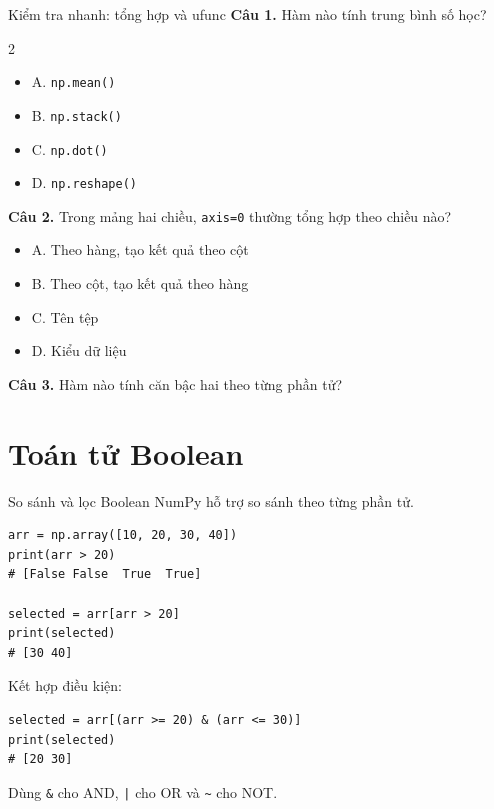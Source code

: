 \documentclass[aspectratio=169,11pt]{beamer}
\newcommand{\quiztitle}[1]{\textbf{\textcolor{QuizOrange}{#1}}}
\begin{document}
\begin{frame}{Kiểm tra nhanh: tổng hợp và ufunc}
\small
\quiztitle{Câu 1.} Hàm nào tính trung bình số học?
\begin{multicols}{2}
\begin{itemize}
  \item A. \texttt{np.mean()}
  \item B. \texttt{np.stack()}
  \item C. \texttt{np.dot()}
  \item D. \texttt{np.reshape()}
\end{itemize}
\end{multicols}
\quiztitle{Câu 2.} Trong mảng hai chiều, \texttt{axis=0} thường tổng hợp theo chiều nào?
\begin{itemize}
  \item A. Theo hàng, tạo kết quả theo cột
  \item B. Theo cột, tạo kết quả theo hàng
  \item C. Tên tệp
  \item D. Kiểu dữ liệu
\end{itemize}
\quiztitle{Câu 3.} Hàm nào tính căn bậc hai theo từng phần tử?
\end{frame}

\section{Toán tử Boolean}

\begin{frame}[fragile]{So sánh và lọc Boolean}
\small
NumPy hỗ trợ so sánh theo từng phần tử.
\begin{lstlisting}[style=py]
arr = np.array([10, 20, 30, 40])
print(arr > 20)
# [False False  True  True]

selected = arr[arr > 20]
print(selected)
# [30 40]
\end{lstlisting}
Kết hợp điều kiện:
\begin{lstlisting}[style=py]
selected = arr[(arr >= 20) & (arr <= 30)]
print(selected)
# [20 30]
\end{lstlisting}
Dùng \texttt{\&} cho AND, \texttt{|} cho OR và \texttt{\textasciitilde} cho NOT.
\end{frame}
\end{document}
